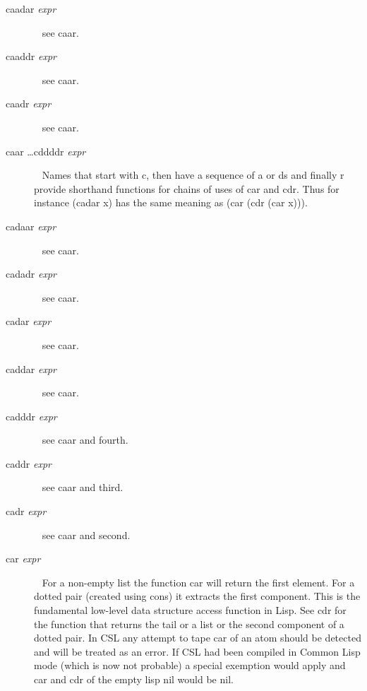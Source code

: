 \documentclass[a4paper,11pt]{article}
\begin{document}
\begin{description}
\item[{\ttfamily caadar} {\itshape expr}] ~\newline
see {\ttfamily caar}.

\item[{\ttfamily caaddr} {\itshape expr}] ~\newline
see {\ttfamily caar}.

\item[{\ttfamily caadr} {\itshape expr}] ~\newline
see {\ttfamily caar}.

\item [{\ttfamily caar \ldots cddddr} {\itshape expr}] ~\newline
Names that start with {\ttfamily c}, then have a sequence of
{\ttfamily a} or {\ttfamily d}s and finally {\ttfamily r} provide
shorthand functions for chains of uses of {\ttfamily car} and
{\ttfamily cdr}. Thus for instance
{\ttfamily (cadar x)} has the same meaning as
{\ttfamily (car (cdr (car x)))}.

\item[{\ttfamily cadaar} {\itshape expr}] ~\newline
see {\ttfamily caar}.

\item[{\ttfamily cadadr} {\itshape expr}] ~\newline
see {\ttfamily caar}.

\item[{\ttfamily cadar} {\itshape expr}] ~\newline
see {\ttfamily caar}.

\item[{\ttfamily caddar} {\itshape expr}] ~\newline
see {\ttfamily caar}.

\item[{\ttfamily cadddr} {\itshape expr}] ~\newline
see {\ttfamily caar} and {\ttfamily fourth}.

\item[{\ttfamily caddr} {\itshape expr}] ~\newline
see {\ttfamily caar} and {\ttfamily third}.

\item [{\ttfamily  cadr} {\itshape expr}] ~\newline
see {\ttfamily caar} and {\ttfamily second}.

\item [{\ttfamily car} {\itshape expr}] ~\newline
For a non-empty list the function {\ttfamily car} will return the
first element. For a dotted pair (created using {\ttfamily cons})
it extracts the first component. This is the fundamental low-level
data structure access function in Lisp. See {\ttfamily cdr} for the
function that returns the tail or a list or the second component of
a dotted pair. In CSL any attempt to tape {\ttfamily car} of an atom
should be detected and will be treated as an error. If CSL had been
compiled in Common Lisp mode (which is now not probable) a special
exemption would apply and {\ttfamily car} and {\ttfamily} cdr of the
empty lisp {\ttfamily nil} would be {\ttfamily nil}.


\end{description}
\end{document}
